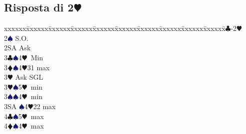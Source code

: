 \documentclass[a4paper,italian]{article}
\newcommand{\BC}{\textcolor{OliveGreen}{$\clubsuit$}}
\newcommand{\BD}{\textcolor{RedOrange}{$\vardiamondsuit$}}
\newcommand{\BH}{\textcolor{Red2}{$\varheartsuit${}}}
\newcommand{\BS}{\textcolor{MidnightBlue}{$\spadesuit${}}}
\newcommand{\pdfh}{\texorpdfstring{\BH{}}{H}}
\newenvironment{bidtable}
{\begin{tabbing}

    xxxxxx\=xxxxxx\=xxxxxx\=xxxxxx\=xxxxxx\=xxxxxx\=xxxxxx\=xxxxxx\=xxxxxx\=xxxxxx\=\kill}
{\end{tabbing} }%
\begin{document}
\begin{multicols}{2}
                                    \subsection{Risposta di 2\pdfh}
                                    \begin{bidtable}
                                        1\BC-2\BH\+\\
                                        2\BS \> S.O.\\
                                        2SA \> Ask\+\\
                                        3\BC {}\BS 4\BH\ Min\\
                                        3\BD {}\BS 4\BH 31 max\+\\
                                        3\BH \> Ask SGL\-\\
                                        3\BH {}\BS 5\BH\ min\\
                                        3\BS {}\BS 4\BH\ min\\
                                        3SA \BS 4\BH 22 max\\
                                        4\BC {}\BS 5\BH\ max\\
                                        4\BD {}\BS 4\BH\ max\-\-
                                    \end{bidtable}
                                \end{multicols}
\end{document}
